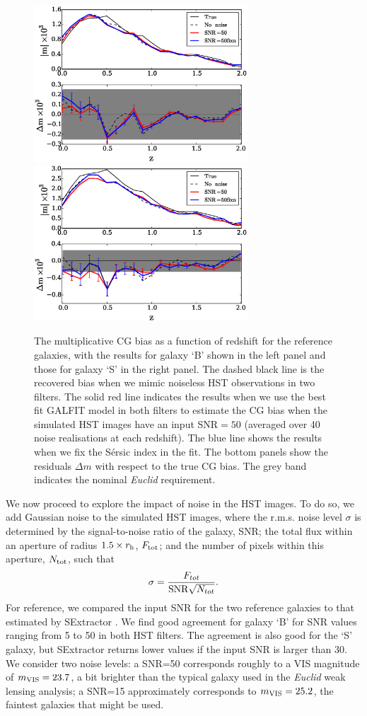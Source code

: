 \documentclass[useAMS,usenatbib]{mnras}
\newcommand{\be}{\begin{equation}}
\newcommand{\ee}{\end{equation}}
\begin{document}
\begin{figure}
  \includegraphics[width=8.0cm]{zs2n_b_snrtt50.eps}
  \includegraphics[width=8.0cm]{zs2n_s_snrtt50.eps}
\caption{The multiplicative CG bias as a function of redshift
  for the reference galaxies, with the results for galaxy `B' shown
  in the left panel and those for galaxy `S' in the right panel.
  The dashed black line is the recovered bias when we mimic
  noiseless HST observations in two filters. The solid red line
  indicates the results when we use the best fit {\sc GALFIT} model
  in both filters to estimate the CG bias when the simulated HST images have
  an input SNR$=50$ (averaged over 40 noise realisations at each
  redshift). The blue line shows the results when we fix the S{\'e}rsic index
  in the fit. The bottom panels show the residuals $\Delta m$ with respect
  to the true CG bias. The grey band indicates the
  nominal {\it Euclid} requirement.}
\label{fig:biasofz50}
\end{figure}

We now proceed to explore the impact of noise in the HST images. To do so, we add Gaussian noise to the simulated HST images, where the r.m.s. noise level $\sigma$ is determined by the signal-to-noise ratio of the galaxy, SNR; the total flux within an aperture of radius $1.5\times r_{\rm h}$, $F_{\rm tot}$; and the number of pixels within this aperture, $N_{\rm tot}$, such that
%
\be
\sigma = {F_{tot} \over {\rm SNR} \sqrt{N_{tot}} }.
\ee
%
For reference, we compared the input SNR for the two reference galaxies
to that estimated by {\sc SExtractor} \citep{Bertin96}.
We find good agreement for galaxy `B' for SNR values ranging from 5 to 50
in both HST filters. The agreement is also good for the `S' galaxy, but
{\sc SExtractor} returns lower values if the input SNR is larger than 30.
We consider two noise levels: a SNR=50 corresponds roughly to a
VIS magnitude of $m_{\rm VIS}=23.7$, a bit brighter than the typical
galaxy used in the {\it Euclid} weak lensing analysis; a SNR=15 approximately
corresponds to $m_{\rm VIS}=25.2$, the faintest galaxies that might be used.
\end{document}
